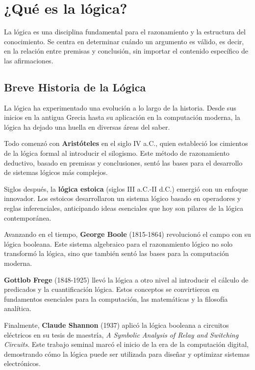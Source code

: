 


\section{¿Qué es la lógica?}


La lógica es una disciplina fundamental para el razonamiento y la estructura del conocimiento. Se centra en determinar cuándo un argumento es válido, es decir, en la relación entre premisas y conclusión, sin importar el contenido específico de las afirmaciones.

\subsection{Breve Historia de la Lógica}

La lógica ha experimentado una evolución  a lo largo de la historia. Desde sus inicios en la antigua Grecia hasta su aplicación en la computación moderna, la lógica ha dejado una huella en diversas áreas del saber.

Todo comenzó con \textbf{Aristóteles} en el siglo IV a.C., quien estableció los cimientos de la lógica formal al introducir el silogismo. Este método de razonamiento deductivo, basado en premisas y conclusiones, sentó las bases para el desarrollo de sistemas lógicos más complejos.

Siglos después, la \textbf{lógica estoica} (siglos III a.C.-II d.C.) emergió con un enfoque innovador. Los estoicos desarrollaron un sistema lógico basado en operadores y reglas inferenciales, anticipando ideas esenciales que hoy son pilares de la lógica contemporánea.

Avanzando en el tiempo, \textbf{George Boole} (1815-1864) revolucionó el campo con su lógica booleana. Este sistema algebraico para el razonamiento lógico no solo transformó la lógica, sino que también sentó las bases para la computación moderna.

\textbf{Gottlob Frege} (1848-1925) llevó la lógica a otro nivel al introducir el cálculo de predicados y la cuantificación lógica. Estos conceptos se convirtieron en fundamentos esenciales para la computación, las matemáticas y la filosofía analítica.

Finalmente, \textbf{Claude Shannon} (1937) aplicó la lógica booleana a circuitos eléctricos en su tesis de maestría, \textit{A Symbolic Analysis of Relay and Switching Circuits}. Este trabajo seminal marcó el inicio de la era de la computación digital, demostrando cómo la lógica puede ser utilizada para diseñar y optimizar sistemas electrónicos.

